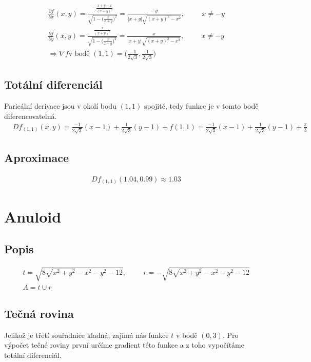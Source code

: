 \documentclass[a4paper]{article}
\newcommand{\tab}{\hspace{1cm}}
\begin{document}
\begin{align*}
	& \frac{\partial f}{\partial x} (x,y) = \frac{-\frac{x+y-x}{(x+y)^2}}{\sqrt{1-\big(\frac{x}{x+y}\big)^2}}	= \frac{-y}{|x+y|\sqrt{(x+y)^2 - x^2}}, \tab x \ne -y \\
	& \frac{\partial f}{\partial y} (x,y) = \frac{\frac{x}{(x+y)^2}}{\sqrt{1-\big(\frac{x}{x+y}\big)^2}} = \frac{x}{|x+y|\sqrt{(x+y)^2-x^2}}, \tab x \ne -y \\
	& \Rightarrow \nabla f \text{v bodě $(1,1)$} = \bigg(\frac{-1}{2\sqrt{3}}, \frac{1}{2\sqrt{3}}\bigg)
\end{align*}

\subsection{Totální diferenciál}

Paricální derivace jsou v okolí bodu $(1,1)$ spojité, tedy funkce je v tomto bodě diferencovatelná.
\begin{align*}
	& Df_{(1,1)}(x,y) = \frac{-1}{2\sqrt{3}} ( x - 1) + \frac{1}{2\sqrt{3}} ( y - 1) + f(1,1) = \frac{-1}{2\sqrt{3}} ( x - 1) + \frac{1}{2\sqrt{3}} ( y - 1) + \frac{\pi}{3}
\end{align*}

\subsection{Aproximace}
\begin{align*}
	& Df_{(1,1)}(1.04, 0.99) \approx 1.03
\end{align*}

\pagebreak
\section{Anuloid}

\subsection{Popis}
\begin{align*}
		& t = \sqrt{8 \sqrt{x^2 + y^2}-x^2 - y^2 - 12},\tab r = -\sqrt{8 \sqrt{x^2 + y^2}-x^2 - y^2 - 12} \\
		& A = t \cup r
\end{align*}
 
\subsection{Tečná rovina}
Jelikož je třetí souřadnice kladná, zajímá nás funkce $t$ v bodě $(0,3)$. Pro výpočet tečné roviny první určíme gradient této funkce a z toho vypočítáme totální diferenciál.
\end{document}
